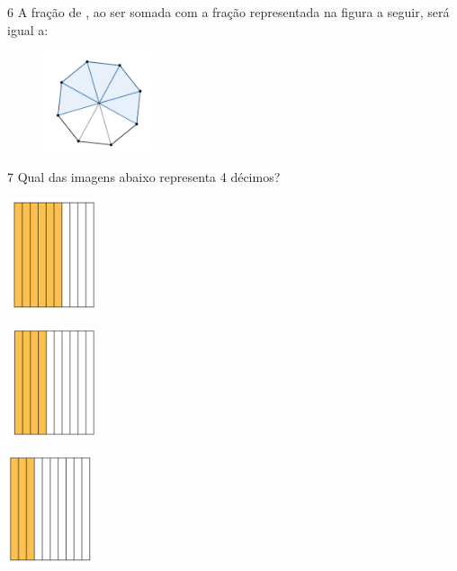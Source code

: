 \begin{escolha}

\num{6} A fração de , ao ser somada com a fração
representada na figura a seguir, será igual a:

\begin{figure}
\centering
\includegraphics[width=1.26562in,height=1.16258in]{./_SAEB_9_MAT/media/image46.png}
\end{figure}

\begin{boxpeq}
\end{boxpeq}

\num{7} Qual das imagens abaixo representa 4 décimos?

\begin{escolha}
\item
  \includegraphics[width=1.0625in,height=1.28788in]{./_SAEB_9_MAT/media/image47.png}

\item
  \includegraphics[width=1.07728in,height=1.29167in]{./_SAEB_9_MAT/media/image48.png}

\item
  \includegraphics[width=1.00521in,height=1.25518in]{./_SAEB_9_MAT/media/image49.png}


\end{escolha}
\end{escolha}
